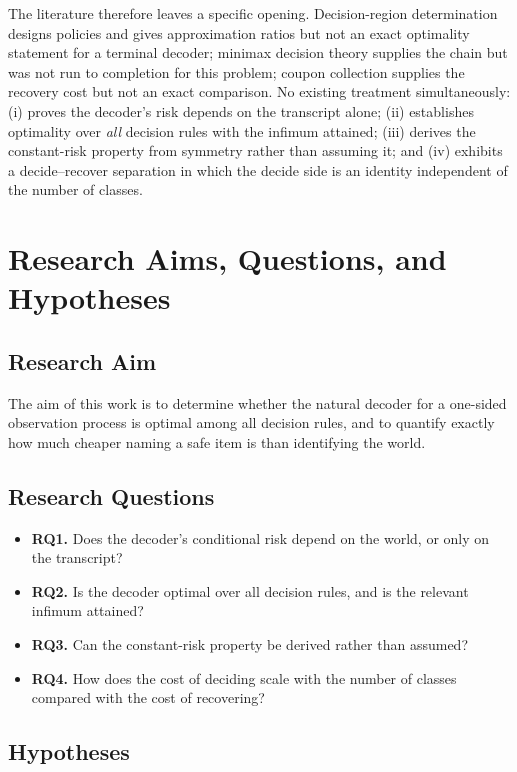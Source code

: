 \documentclass[conference]{IEEEtran}
\theoremstyle{definition}
\begin{document}
The literature therefore leaves a specific opening. Decision-region determination designs
policies and gives approximation ratios but not an exact optimality statement for a terminal
decoder; minimax decision theory supplies the chain but was not run to completion for this
problem; coupon collection supplies the recovery cost but not an exact comparison. No existing
treatment simultaneously: (i) proves the decoder's risk depends on the transcript alone;
(ii) establishes optimality over \emph{all} decision rules with the infimum attained;
(iii) derives the constant-risk property from symmetry rather than assuming it; and
(iv) exhibits a decide--recover separation in which the decide side is an identity independent
of the number of classes.

\section{Research Aims, Questions, and Hypotheses}

\subsection{Research Aim}

The aim of this work is to determine whether the natural decoder for a one-sided observation
process is optimal among all decision rules, and to quantify exactly how much cheaper naming
a safe item is than identifying the world.

\subsection{Research Questions}

\begin{itemize}
\item \textbf{RQ1.} Does the decoder's conditional risk depend on the world, or only on the
transcript?
\item \textbf{RQ2.} Is the decoder optimal over all decision rules, and is the relevant
infimum attained?
\item \textbf{RQ3.} Can the constant-risk property be derived rather than assumed?
\item \textbf{RQ4.} How does the cost of deciding scale with the number of classes compared
with the cost of recovering?
\end{itemize}

\subsection{Hypotheses}
\end{document}
